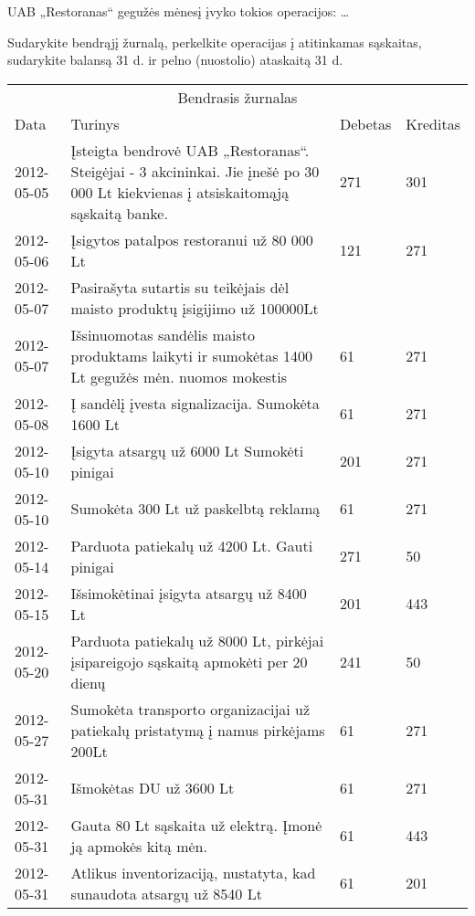 \begin{tasks}

  \begin{task}
    \begin{condition}
      UAB „Restoranas“ gegužės mėnesį įvyko tokios operacijos: …

      Sudarykite bendrąjį žurnalą, perkelkite operacijas į
      atitinkamas sąskaitas, sudarykite balansą 31 d. ir pelno
      (nuostolio) ataskaitą 31 d.
    \end{condition}
    \begin{solution}
      \begin{tabularx}{\ltablewidth}[]{X | p{8cm} | X | X}
        \multicolumn{4}{c}{Bendrasis žurnalas} \\
        Data & Turinys & Debetas & Kreditas \\
        \hline
        2012-05-05 &
          Įsteigta bendrovė UAB „Restoranas“. Steigėjai - 3
          akcininkai. Jie įnešė po 30 000 Lt kiekvienas į
          atsiskaitomąją sąskaitą banke.
          & 271 & 301 \\
        2012-05-06 &
          Įsigytos patalpos restoranui už 80 000 Lt
          & 121 & 271 \\
        2012-05-07 &
          Pasirašyta sutartis su teikėjais dėl maisto produktų
          įsigijimo už 100000Lt
          & & \\
        2012-05-07 &
          Išsinuomotas sandėlis maisto produktams laikyti ir
          sumokėtas 1400 Lt gegužės mėn. nuomos mokestis
          & 61 & 271 \\
        2012-05-08 &
          Į sandėlį įvesta signalizacija. Sumokėta 1600 Lt
          & 61 & 271 \\
        2012-05-10 &
          Įsigyta atsargų už 6000 Lt Sumokėti pinigai
          & 201 & 271 \\
        2012-05-10 &
          Sumokėta 300 Lt už paskelbtą reklamą
          & 61 & 271 \\
        2012-05-14 &
          Parduota patiekalų už 4200 Lt. Gauti pinigai
          & 271 & 50 \\
        2012-05-15 &
          Išsimokėtinai įsigyta atsargų už 8400 Lt
          & 201 & 443 \\
        2012-05-20 &
          Parduota patiekalų už 8000 Lt, pirkėjai įsipareigojo
          sąskaitą apmokėti per 20 dienų
          & 241 & 50 \\
        2012-05-27 &
          Sumokėta transporto organizacijai už patiekalų pristatymą
          į namus pirkėjams 200Lt
          & 61 & 271 \\
        2012-05-31 &
          Išmokėtas DU už 3600 Lt
          & 61 & 271 \\
        2012-05-31 &
          Gauta 80 Lt sąskaita už elektrą. Įmonė ją apmokės kitą mėn.
          & 61 & 443 \\
        2012-05-31 &
          Atlikus inventorizaciją, nustatyta, kad sunaudota atsargų
          už 8540 Lt
          & 61 & 201 \\
      \end{tabularx}


\end{solution}
\end{task}
\end{tasks}

